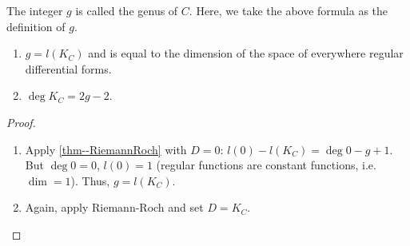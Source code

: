 \documentclass[a4paper,11pt]{article}
\begin{document}
			The integer $g$ is called the genus of $C$. Here, we take the above formula as the definition of $g$.

			\begin{cor}\label{cor--riemannroch}
				\begin{enumerate}
					\item $g=l(K_C)$ and is equal to the dimension of the space of everywhere regular differential forms.
					\item $\deg K_C=2g-2$.
				\end{enumerate}
			\end{cor}
			\begin{proof}
				\begin{enumerate}
					\item Apply \autoref{thm--RiemannRoch} with $D=0$: $l(0)-l(K_C)=\deg 0-g+1$. But $\deg0=0$, $l(0)=1$ (regular functions are constant functions, i.e. $\dim=1$). Thus, $g=l(K_C)$.
					\item Again, apply Riemann-Roch and set $D=K_C$.
				\end{enumerate}
			\end{proof}
\end{document}
